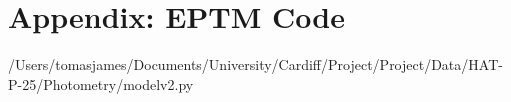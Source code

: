 \documentclass{report}
\begin{document}

\nocite{*}
\printbibliography


\appendix
\newpage
\section{Appendix: EPTM Code}


{/Users/tomasjames/Documents/University/Cardiff/Project/Project/Data/HAT-P-25/Photometry/modelv2.py}
\end{document}
